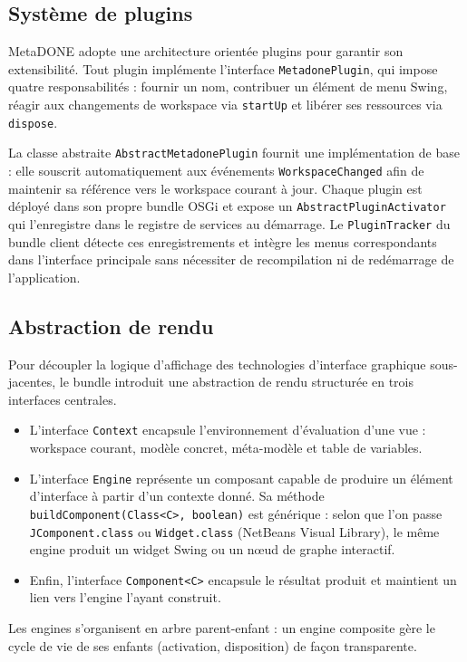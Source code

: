 \subsection{Système de plugins}

MetaDONE adopte une architecture orientée plugins pour garantir son extensibilité. Tout plugin implémente l'interface \texttt{MetadonePlugin}, qui impose quatre responsabilités : fournir un nom, contribuer un élément de menu Swing, réagir aux changements de workspace via \texttt{startUp} et libérer ses ressources via \texttt{dispose}.

La classe abstraite \texttt{AbstractMetadonePlugin} fournit une implémentation de base : elle souscrit automatiquement aux événements \texttt{WorkspaceChanged} afin de maintenir sa référence vers le workspace courant à jour. Chaque plugin est déployé dans son propre bundle OSGi et expose un \texttt{AbstractPluginActivator} qui l'enregistre dans le
registre de services au démarrage. Le \texttt{PluginTracker} du bundle client détecte ces enregistrements et intègre les menus correspondants dans l'interface principale sans nécessiter de recompilation ni de redémarrage de l'application.

\subsection{Abstraction de rendu}

Pour découpler la logique d'affichage des technologies d'interface graphique sous-jacentes, le bundle introduit une abstraction de rendu structurée en trois interfaces centrales.
\begin{itemize}
    \item L'interface \texttt{Context} encapsule l'environnement d'évaluation d'une vue : workspace courant, modèle concret, méta-modèle et table de variables.
    \item L'interface \texttt{Engine} représente un composant capable de produire un élément d'interface à partir d'un contexte donné. Sa méthode \texttt{buildComponent(Class<C>, boolean)} est générique : selon que l'on passe \texttt{JComponent.class} ou \texttt{Widget.class} (NetBeans Visual Library), le même engine produit un widget Swing ou un nœud de graphe interactif. 
    \item Enfin, l'interface \texttt{Component<C>} encapsule le résultat produit et maintient un lien vers l'engine l'ayant construit.
\end{itemize}
Les engines s'organisent en arbre parent-enfant : un engine composite gère le cycle de vie de ses enfants (activation, disposition) de façon transparente.

